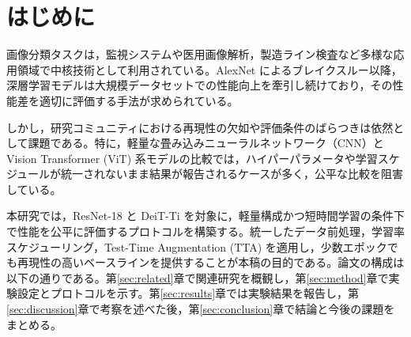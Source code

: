 \section{はじめに}
画像分類タスクは，監視システムや医用画像解析，製造ライン検査など多様な応用領域で中核技術として利用されている。AlexNet によるブレイクスルー以降，深層学習モデルは大規模データセットでの性能向上を牽引し続けており，その性能差を適切に評価する手法が求められている。\cite{krizhevsky2012imagenet}

しかし，研究コミュニティにおける再現性の欠如や評価条件のばらつきは依然として課題である。特に，軽量な畳み込みニューラルネットワーク（CNN）と Vision Transformer (ViT) 系モデルの比較では，ハイパーパラメータや学習スケジュールが統一されないまま結果が報告されるケースが多く，公平な比較を阻害している。\cite{henderson2018deep}

本研究では，ResNet-18 と DeiT-Ti を対象に，軽量構成かつ短時間学習の条件下で性能を公平に評価するプロトコルを構築する。統一したデータ前処理，学習率スケジューリング，Test-Time Augmentation (TTA) を適用し，少数エポックでも再現性の高いベースラインを提供することが本稿の目的である。論文の構成は以下の通りである。第\ref{sec:related}章で関連研究を概観し，第\ref{sec:method}章で実験設定とプロトコルを示す。第\ref{sec:results}章では実験結果を報告し，第\ref{sec:discussion}章で考察を述べた後，第\ref{sec:conclusion}章で結論と今後の課題をまとめる。
